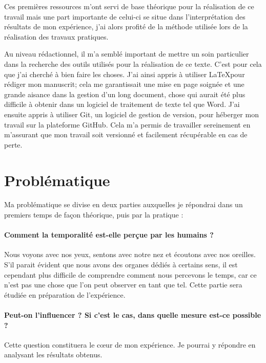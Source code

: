 \documentclass[12pt,fleqn,oneside,openany]{book} %
\begin{document}
Ces premières ressources m'ont servi de base théorique pour la réalisation de ce travail mais une part importante de celui-ci se situe dans l'interprétation des résultats de mon expérience, j'ai alors profité de la méthode utilisée lors de la réalisation des travaux pratiques.

Au niveau rédactionnel, il m'a semblé important de mettre un soin particulier dans la recherche des outils utilisés pour la réalisation de ce texte. C'est pour cela que j'ai cherché à bien faire les choses. J'ai ainsi appris à utiliser \LaTeX pour rédiger mon manuscrit; cela me garantissait une mise en page soignée et une grande aisance dans la gestion d'un long document, chose qui aurait été plus difficile à obtenir dans un logiciel de traitement de texte tel que Word. J'ai ensuite appris à utiliser Git, un logiciel de gestion de version, pour héberger mon travail sur la plateforme GitHub. Cela m'a permis de travailler sereinement en m'assurant que mon travail soit versionné et facilement récupérable en cas de perte.

\section{Problématique} \label{sec:problematique}
Ma problématique se divise en deux parties auxquelles je répondrai dans un premiers temps de façon théorique, puis par la pratique :

\paragraph{Comment la temporalité est-elle perçue par les humains ?} Nous voyons avec nos yeux, sentons avec notre nez et écoutons avec nos oreilles. S'il parait évident que nous avons des organes dédiés à certains sens, il est cependant plus difficile de comprendre comment nous percevons le temps, car ce n'est pas une chose que l'on peut observer en tant que tel. Cette partie sera étudiée en préparation de l'expérience. 

\paragraph{Peut-on l'influencer ? Si c'est le cas, dans quelle mesure est-ce possible ? } Cette question constituera le cœur de mon expérience. Je pourrai y répondre en analysant les résultats obtenus. 
\end{document}
